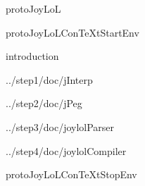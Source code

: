 
\usemodule[t-diSimp]

\startDiSimpComponent protoJoyLoL

\diSimpEnvironment protoJoyLoLConTeXtStartEnv

\diSimpComponent introduction

\diSimpComponent ../step1/doc/jInterp

\diSimpComponent ../step2/doc/jPeg

\diSimpComponent ../step3/doc/joylolParser

\diSimpComponent ../step4/doc/joylolCompiler

\diSimpEnvironment protoJoyLoLConTeXtStopEnv

\stopDiSimpComponent
